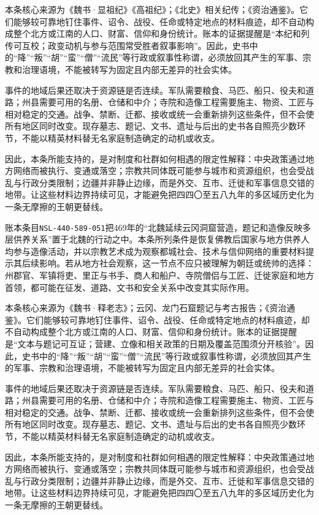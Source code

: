 本条核心来源为《魏书·显祖纪》《高祖纪》；《北史》相关纪传；《资治通鉴》。它们能够较可靠地钉住事件、诏令、战役、任命或特定地点的材料痕迹，却不自动构成整个北方或江南的人口、财富、信仰和身份统计。账本的证据提醒是“本纪和列传可互校；政变动机与参与范围常受胜者叙事影响”。因此，史书中的“降”“叛”“胡”“蛮”“僧”“流民”等行政或叙事性称谓，必须放回其产生的军事、宗教和治理语境，不能被转写为固定且内部无差异的社会实体。

事件的地域后果还取决于资源链是否连续。军队需要粮食、马匹、船只、役夫和道路；州县需要可用的名册、仓储和中介；寺院和造像工程需要施主、物资、工匠与相对稳定的交通。战争、禁断、迁都、接收或统一会重新排列这些条件，但不会使所有地区同时改变。现存墓志、题记、文书、遗址与后出的史书各自照亮少数环节，不能以精英材料替无名家庭制造确定的动机或收支。

因此，本条所能支持的，是对制度和社群如何相遇的限定性解释：中央政策通过地方网络而被执行、变通或落空；宗教共同体既可能参与城市和资源组织，也会受战乱与行政分类限制；边疆并非静止边缘，而是外交、互市、迁徙和军事信息交错的地带。让这些材料边界持续可见，才能避免把四四〇至五八九年的多区域历史化为一条无摩擦的王朝更替线。

账本条目\texttt{NSL-440-589-051}把469年的“北魏延续云冈洞窟营造，题记和造像反映多层供养关系”置于北魏的行动之中。本条所列条件是恢复佛教后国家与地方供养人均参与造像活动，并以宗教艺术成为观察都城社会、技术与信仰网络的重要材料提示其后续影响。若从地方社会观察，这一节点不应只被理解为朝廷或统帅的选择：州郡官、军镇将吏、里正与书手、商人和船户、寺院僧侣与工匠、迁徙家庭和地方首领，都可能在征发、道路、文书和安全关系中改变其实际作用。

本条核心来源为《魏书·释老志》；云冈、龙门石窟题记与考古报告；《资治通鉴》。它们能够较可靠地钉住事件、诏令、战役、任命或特定地点的材料痕迹，却不自动构成整个北方或江南的人口、财富、信仰和身份统计。账本的证据提醒是“文本与题记可互证；营建、立像和相关政策的日期及覆盖范围须分开核验”。因此，史书中的“降”“叛”“胡”“蛮”“僧”“流民”等行政或叙事性称谓，必须放回其产生的军事、宗教和治理语境，不能被转写为固定且内部无差异的社会实体。

事件的地域后果还取决于资源链是否连续。军队需要粮食、马匹、船只、役夫和道路；州县需要可用的名册、仓储和中介；寺院和造像工程需要施主、物资、工匠与相对稳定的交通。战争、禁断、迁都、接收或统一会重新排列这些条件，但不会使所有地区同时改变。现存墓志、题记、文书、遗址与后出的史书各自照亮少数环节，不能以精英材料替无名家庭制造确定的动机或收支。

因此，本条所能支持的，是对制度和社群如何相遇的限定性解释：中央政策通过地方网络而被执行、变通或落空；宗教共同体既可能参与城市和资源组织，也会受战乱与行政分类限制；边疆并非静止边缘，而是外交、互市、迁徙和军事信息交错的地带。让这些材料边界持续可见，才能避免把四四〇至五八九年的多区域历史化为一条无摩擦的王朝更替线。

